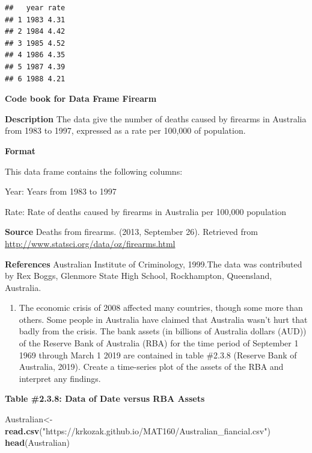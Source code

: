 \documentclass[]{book}
\newenvironment{Shaded}{\begin{snugshade}}{\end{snugshade}}
\newcommand{\KeywordTok}[1]{\textcolor[rgb]{0.13,0.29,0.53}{\textbf{#1}}}
\newcommand{\NormalTok}[1]{#1}
\newcommand{\StringTok}[1]{\textcolor[rgb]{0.31,0.60,0.02}{#1}}
\providecommand{\tightlist}{%
  \setlength{\itemsep}{0pt}\setlength{\parskip}{0pt}}
\begin{document}
\begin{verbatim}
##   year rate
## 1 1983 4.31
## 2 1984 4.42
## 3 1985 4.52
## 4 1986 4.35
## 5 1987 4.39
## 6 1988 4.21
\end{verbatim}

\textbf{Code book for Data Frame Firearm}

\textbf{Description}
The data give the number of deaths caused by firearms in Australia from 1983 to 1997, expressed as a rate per 100,000 of population.

\textbf{Format}

This data frame contains the following columns:

Year: Years from 1983 to 1997

Rate: Rate of deaths caused by firearms in Australia per 100,000 population

\textbf{Source}
Deaths from firearms. (2013, September 26). Retrieved from
\url{http://www.statsci.org/data/oz/firearms.html}

\textbf{References}
Australian Institute of Criminology, 1999.The data was contributed by Rex Boggs, Glenmore State High School, Rockhampton, Queensland, Australia.

\begin{enumerate}
\def\labelenumi{\arabic{enumi}.}
\setcounter{enumi}{5}
\tightlist
\item
  The economic crisis of 2008 affected many countries, though some more than others. Some people in Australia have claimed that Australia wasn't hurt that badly from the crisis. The bank assets (in billions of Australia dollars (AUD)) of the Reserve Bank of Australia (RBA) for the time period of September 1 1969 through March 1 2019 are contained in table \#2.3.8 (Reserve Bank of Australia, 2019). Create a time-series plot of the assets of the RBA and interpret any findings.
\end{enumerate}

\textbf{Table \#2.3.8: Data of Date versus RBA Assets}

\begin{Shaded}
\begin{Highlighting}[]
\NormalTok{Australian<-}\StringTok{ }\KeywordTok{read.csv}\NormalTok{(}\StringTok{"https://krkozak.github.io/MAT160/Australian_fiancial.csv"}\NormalTok{)}
\KeywordTok{head}\NormalTok{(Australian)}
\end{Highlighting}
\end{Shaded}
\end{document}
